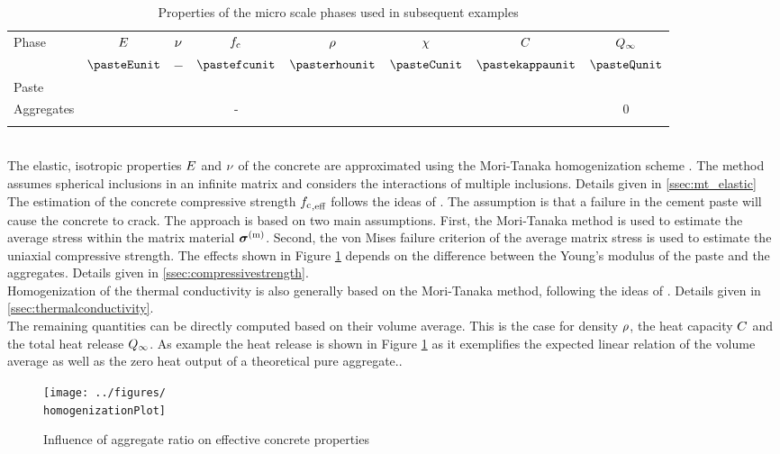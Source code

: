 \begin{table}[ht]
	\begin{center}
		\begin{minipage}{.9\textwidth}
			\caption{Properties of the micro scale phases used in subsequent examples}\label{tab:homogenizationproperties}
			\begin{tabular}{lccccccc}
				\toprule
				Phase & $E$ & $\nu$ & $f_{\text{c}}$ & $\rho$ & $\chi$ & $C$ & $Q_{\infty}$\\
				  & $\pasteEunit$  & $-$  & $\pastefcunit$  & $\pasterhounit$  & $\pasteCunit$  & $\pastekappaunit$  &  $\pasteQunit$ \\
				\midrule
			Paste	& \pasteE & \pastenu & \pastefc & \pasterho & \pasteC & \pastekappa &  \pasteQ \\
			Aggregates	& \aggregatesE & \aggregatesnu & - & \aggregatesrho & \aggregatesC & \aggregateskappa &  0 \\
				\botrule
			\end{tabular}
		\end{minipage}
	\end{center}
		
\end{table}
\\
The elastic, isotropic properties $E$ and $\nu$ of the concrete are approximated using the Mori-Tanaka homogenization scheme \cite{mor_1973_asi}.
The method assumes spherical inclusions in an infinite matrix and considers the interactions of multiple inclusions. Details given in \ref{ssec:mt_elastic}\\
The estimation of the concrete compressive strength ${f_{\text{c}}}_{,\text{eff}}$ follows the ideas of \cite{nev_2018_mcam}.
The assumption is that a failure in the cement paste will cause the concrete to crack.
The approach is based on two main assumptions.
First, the Mori-Tanaka method is used to estimate the average stress within the matrix material $\boldsymbol{\sigma}^{(\text{m})}$. 
Second, the von Mises failure criterion of the average matrix stress is used to estimate the uniaxial compressive strength.
The effects shown in Figure \ref{fig:homogenization} depends on the difference between the Young's modulus of the paste and the aggregates. Details given in \ref{ssec:compressivestrength}.\\
Homogenization of the thermal conductivity is also generally based on the Mori-Tanaka method, following the ideas of \cite{str_2011_mbeo}. Details given in \ref{ssec:thermalconductivity}.\\
The remaining quantities can be directly computed based on their volume average.
This is the case for density $\rho$, the heat capacity $C$ and the total heat release $Q_{\infty}$.
As example the heat release is shown in Figure \ref{fig:homogenization} as it exemplifies the expected linear relation of the volume average as well as the zero heat output of a theoretical pure aggregate..
\begin{figure}[ht]%
	\centering
	\texttt{[image: ../figures/\\homogenizationPlot]}
	\caption{Influence of aggregate ratio on effective concrete properties}\label{fig:homogenization}
\end{figure}